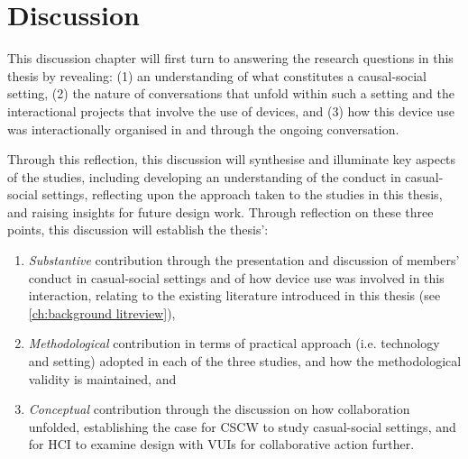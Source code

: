 


\chapter{Discussion}\label{ch:synopsis discussion}



\begin{revisedsubmission}
This discussion chapter will first turn to answering the research questions in this thesis by revealing: (1) an understanding of what constitutes a causal-social setting, (2) the nature of conversations that unfold within such a setting and the interactional projects that involve the use of devices, and (3) how this device use was interactionally organised in and through the ongoing conversation.


Through this reflection, this discussion will synthesise and illuminate key aspects of the studies, including developing an understanding of the conduct in casual-social settings, reflecting upon the approach taken to the studies in this thesis, and raising insights for future design work.
Through reflection on these three points, this discussion will establish the thesis':
\begin{enumerate}
    \item \textit{Substantive} contribution through the presentation and discussion of members' conduct in casual-social settings and of how device use was involved in this interaction, relating to the existing literature introduced in this thesis (see \autoref{ch:background litreview}),
    \item \textit{Methodological} contribution in terms of practical approach (i.e. technology and setting) adopted in each of the three studies, and how the methodological validity is maintained, and
    \item \textit{Conceptual} contribution through the discussion on how collaboration unfolded, establishing the case for \ac{CSCW} to study casual-social settings, and for \ac{HCI} to examine design with \acp{VUI} for collaborative action further.
\end{enumerate}
\end{revisedsubmission}
